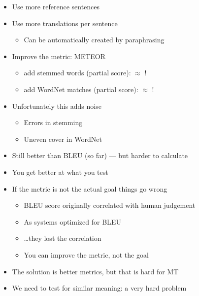 \documentclass[a4paper,landscape,headrule,footrule,xetex]{foils}
\begin{document}

\begin{itemize}
\item Use more reference sentences
\item Use more translations per sentence
  \begin{itemize}
  \item Can be automatically created by paraphrasing
  \end{itemize}
\item Improve the metric: METEOR
  \begin{itemize}
  \item add stemmed words (partial score):  $\approx$ !
  \item add WordNet matches (partial score):  $\approx$ !
  \end{itemize}
\item Unfortunately this adds noise 
  \begin{itemize}
  \item Errors in stemming
  \item Uneven cover in WordNet
  \end{itemize}
\item Still better than BLEU (so far) --- but harder to calculate
\end{itemize}






\begin{itemize}
\item {\large You get better at what you test}
\item If the metric is not the actual goal things go wrong
  \begin{itemize}
  \item  BLEU score originally correlated with human judgement
  \item As systems optimized for BLEU
  \item \ldots they lost the correlation
  \item You can  improve the metric, not the goal
  \end{itemize}
\item The solution is better metrics, but that is hard for MT
\item We need to test for similar meaning: a very hard problem
\end{itemize}
\end{document}
